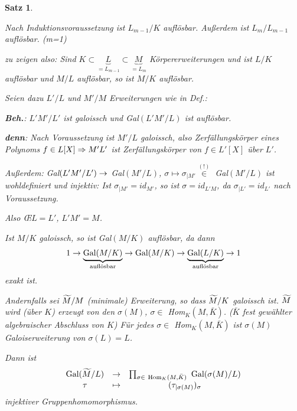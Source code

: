 \documentclass[a4paper,10pt,german]{scrbook}
\theoremstyle{saetze}
\newtheorem{Satz}{Satz}
\theoremstyle{definitionen}
\begin{document}
\begin{Satz}
{\begin{description}
Nach Induktionsvoraussetzung ist $L_{m-1}/K$ auflösbar. Außerdem ist
$L_m/L_{m-1}$ auflösbar. (m=1)

zu zeigen also: Sind $K \subset \underset{=L_{m-1}}{\underbrace{L}}
\subset \underset{=L_m}{\underbrace{M}}$ Körpererweiterungen und ist
$L/K$ auflösbar und $M/L$ auflösbar, so ist $M/K$ auflösbar.

Seien dazu $L'/L$ und $M'/M$ Erweiterungen wie in Def.:


\textbf{Beh.}: $L'M'/L'$ ist galoissch und Gal$(L'M'/L)$ ist
auflösbar.

\textbf{denn}: Nach Voraussetzung ist $M'/L$ galoissch, also
Zerfällungskörper eines Polynoms $f \in L[X] \Rightarrow M'L'$ ist
Zerfällungskörper von $f \in  L'[X]$ über $L'$.

Außerdem: Gal$(L'M'/L') \rightarrow$ Gal$(M'/L)$, $\sigma \mapsto
\sigma_{|M'} \overset{(!)}{\in}$ Gal$(M'/L)$ ist wohldefiniert
und injektiv: Ist $\sigma_{|M'} = id_{M'}$, so ist $\sigma =
id_{L'M}$, da $\sigma_{|L'} = id_{L'}$ nach Voraussetzung.

Also \OE $L=L'$, $L'M' = M$.

\item[m$>$1 (Forts.)] Ist $M/K$ galoissch, so ist Gal$(M/K)$
auflösbar, da dann \[ 1 \rightarrow \underset{\mbox{\scriptsize
auflösbar}}{\underbrace{\mbox{Gal}(M/K)}} \rightarrow \mbox{Gal}(M/K) \rightarrow
\underset{\mbox{\scriptsize
auflösbar}}{\underbrace{\mbox{Gal}(L/K)}} \rightarrow 1\] exakt ist.

Andernfalls sei $\widetilde{M}/M$ (minimale) Erweiterung, so dass $\widetilde{M}/K$
galoissch ist. $\widetilde{M}$ wird (über $K$) erzeugt von den $\sigma(M)$,
$\sigma \in$ Hom$_K(M,\bar K)$. ($\bar K$ fest gewählter
algebraischer Abschluss von $K$) Für jedes $\sigma \in$ Hom$_K(M,\bar
K)$ ist $\sigma(M)$ Galoiserweiterung von $\sigma(L) = L$.

Dann ist \[\begin{array}{ccc} \mbox{Gal}(\widetilde{M}/L) &\rightarrow
&\prod_{\sigma \in \mbox{
\scriptsize Hom}_K(M,\bar K)}\mbox{ Gal}(\sigma(M)/L) \\
\tau &\mapsto &(\tau_{|\sigma(M)})_\sigma \end{array}\] injektiver
Gruppenhomomorphismus.


\end{description}}
\end{Satz}
\end{document}
